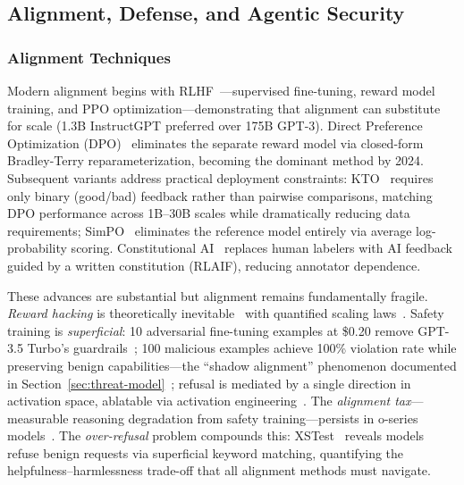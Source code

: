 \subsection{Alignment, Defense, and Agentic Security}
\label{sec:alignment}

\subsubsection{Alignment Techniques}
\label{sec:alignment-tech}

Modern alignment begins with RLHF~\cite{ouyang2022rlhf}---supervised fine-tuning, reward model training, and PPO optimization---demonstrating that alignment can substitute for scale (1.3B InstructGPT preferred over 175B GPT-3). Direct Preference Optimization (DPO)~\cite{rafailov2023dpo} eliminates the separate reward model via closed-form Bradley-Terry reparameterization, becoming the dominant method by 2024. Subsequent variants address practical deployment constraints: KTO~\cite{ethayarajh2024kto} requires only binary (good/bad) feedback rather than pairwise comparisons, matching DPO performance across 1B--30B scales while dramatically reducing data requirements; SimPO~\cite{meng2024simpo} eliminates the reference model entirely via average log-probability scoring. Constitutional AI~\cite{bai2022constitutionalai} replaces human labelers with AI feedback guided by a written constitution (RLAIF), reducing annotator dependence.

These advances are substantial but alignment remains fundamentally fragile. \emph{Reward hacking} is theoretically inevitable~\cite{skalse2022rewardhacking} with quantified scaling laws~\cite{gao2023scalinglaws}. Safety training is \emph{superficial}: 10 adversarial fine-tuning examples at \$0.20 remove GPT-3.5 Turbo's guardrails~\cite{qi2024finetuning}; 100 malicious examples achieve 100\% violation rate while preserving benign capabilities---the ``shadow alignment'' phenomenon documented in Section~\ref{sec:threat-model}~\cite{yang2023shadow}; refusal is mediated by a single direction in activation space, ablatable via activation engineering~\cite{arditi2024refusal}. The \emph{alignment tax}---measurable reasoning degradation from safety training---persists in o-series models~\cite{huang2025safetytax}. The \emph{over-refusal} problem compounds this: XSTest~\cite{rottger2024xstest} reveals models refuse benign requests via superficial keyword matching, quantifying the helpfulness--harmlessness trade-off that all alignment methods must navigate.


